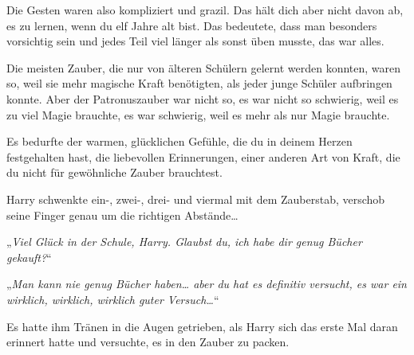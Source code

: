 Die Gesten waren also kompliziert und grazil. Das hält dich aber nicht davon ab, es zu lernen, wenn du elf Jahre alt bist. Das bedeutete, dass man besonders vorsichtig sein und jedes Teil viel länger als sonst üben musste, das war alles.

Die meisten Zauber, die nur von älteren Schülern gelernt werden konnten, waren so, weil sie mehr magische Kraft benötigten, als jeder junge Schüler aufbringen konnte. Aber der Patronuszauber war nicht so, es war nicht so schwierig, weil es zu viel Magie brauchte, es war schwierig, weil es mehr als nur Magie brauchte.

Es bedurfte der warmen, glücklichen Gefühle, die du in deinem Herzen festgehalten hast, die liebevollen Erinnerungen, einer anderen Art von Kraft, die du nicht für gewöhnliche Zauber brauchtest.

Harry schwenkte ein-, zwei-, drei- und viermal mit dem Zauberstab, verschob seine Finger genau um die richtigen Abstände…

„\emph{Viel Glück in der Schule, Harry. Glaubst du, ich habe dir genug Bücher gekauft?}“

„\emph{Man kann nie genug Bücher haben… aber du hat es \emph{definitiv} versucht, es war ein wirklich, wirklich, wirklich guter Versuch…}“

Es hatte ihm Tränen in die Augen getrieben, als Harry sich das erste Mal daran erinnert hatte und versuchte, es in den Zauber zu packen.

